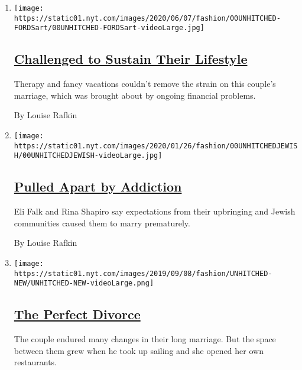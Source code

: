 \begin{enumerate}
\def\labelenumi{\arabic{enumi}.}
\item
  \texttt{[image: https://static01.nyt.com/images/2020/06/07/fashion/00UNHITCHED-FORDSart/00UNHITCHED-FORDSart-videoLarge.jpg]}

  \hypertarget{challenged-to-sustain-their-lifestyle}{%
  \subsection{\texorpdfstring{\href{/2020/06/03/fashion/weddings/Unhitched-couple-discusses-their-marriage-and-divorce.html}{Challenged
  to Sustain Their
  Lifestyle}}{Challenged to Sustain Their Lifestyle}}\label{challenged-to-sustain-their-lifestyle}}

  Therapy and fancy vacations couldn't remove the strain on this
  couple's marriage, which was brought about by ongoing financial
  problems.

  By Louise Rafkin
\item
  \texttt{[image: https://static01.nyt.com/images/2020/01/26/fashion/00UNHITCHEDJEWISH/00UNHITCHEDJEWISH-videoLarge.jpg]}

  \hypertarget{pulled-apart-by-addiction}{%
  \subsection{\texorpdfstring{\href{/2020/01/27/fashion/weddings/Unhitched-couple-is-pulled-apart-by-addiction.html}{Pulled
  Apart by
  Addiction}}{Pulled Apart by Addiction}}\label{pulled-apart-by-addiction}}

  Eli Falk and Rina Shapiro say expectations from their upbringing and
  Jewish communities caused them to marry prematurely.

  By Louise Rafkin
\item
  \texttt{[image: https://static01.nyt.com/images/2019/09/08/fashion/UNHITCHED-NEW/UNHITCHED-NEW-videoLarge.png]}

  \hypertarget{the-perfect-divorce}{%
  \subsection{\texorpdfstring{\href{/interactive/2019/09/07/multimedia/how-to-get-divorced.html}{The
  Perfect Divorce}}{The Perfect Divorce}}\label{the-perfect-divorce}}

  The couple endured many changes in their long marriage. But the space
  between them grew when he took up sailing and she opened her own
  restaurants.


\end{enumerate}
